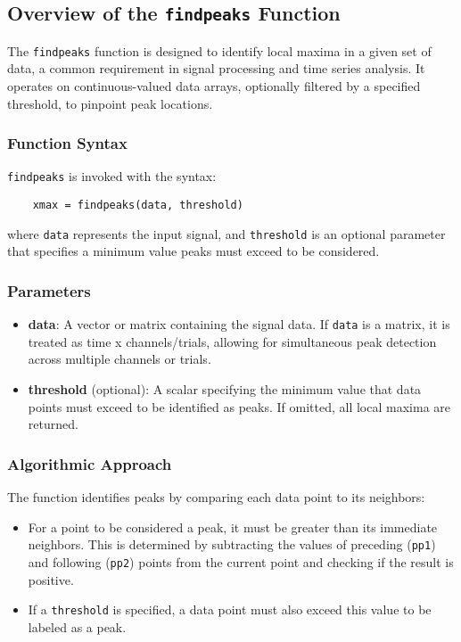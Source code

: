\subsection{Overview of the \texttt{findpeaks} Function}

The \texttt{findpeaks} function is designed to identify local maxima in a given set of data, a common requirement in signal processing and time series analysis. It operates on continuous-valued data arrays, optionally filtered by a specified threshold, to pinpoint peak locations.

\subsubsection{Function Syntax}

\texttt{findpeaks} is invoked with the syntax:

\begin{verbatim}
    xmax = findpeaks(data, threshold)
\end{verbatim}

where \texttt{data} represents the input signal, and \texttt{threshold} is an optional parameter that specifies a minimum value peaks must exceed to be considered.

\subsubsection{Parameters}

\begin{itemize}
    \item \textbf{data}: A vector or matrix containing the signal data. If \texttt{data} is a matrix, it is treated as time x channels/trials, allowing for simultaneous peak detection across multiple channels or trials.
    \item \textbf{threshold} (optional): A scalar specifying the minimum value that data points must exceed to be identified as peaks. If omitted, all local maxima are returned.
\end{itemize}

\subsubsection{Algorithmic Approach}

The function identifies peaks by comparing each data point to its neighbors:
\begin{itemize}
    \item For a point to be considered a peak, it must be greater than its immediate neighbors. This is determined by subtracting the values of preceding (\texttt{pp1}) and following (\texttt{pp2}) points from the current point and checking if the result is positive.
    \item If a \texttt{threshold} is specified, a data point must also exceed this value to be labeled as a peak.
\end{itemize}

